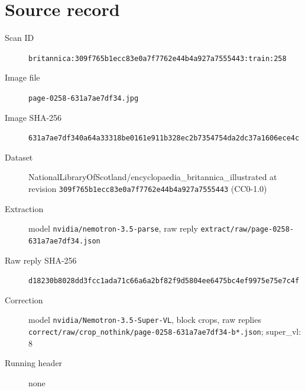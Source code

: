\documentclass{article}
\begin{document}
\section*{Source record}
\begin{description}
\item[Scan ID] \texttt{britannica:309f765b1ecc83e0a7f7762e44b4a927a7555443:train:258}
\item[Image file] \texttt{page-0258-631a7ae7df34.jpg}
\item[Image SHA-256] \texttt{631a7ae7df340a64a33318be0161e911b328ec2b7354754da2dc37a1606ece4c}
\item[Dataset] NationalLibraryOfScotland/encyclopaedia\_britannica\_illustrated at revision \texttt{309f765b1ecc83e0a7f7762e44b4a927a7555443} (CC0-1.0)
\item[Extraction] model \texttt{nvidia/nemotron-3.5-parse}, raw reply \texttt{extract/raw/page-0258-631a7ae7df34.json}
\item[Raw reply SHA-256] \texttt{d18230b8028dd3fcc1ada71c66a6a2bf82f9d5804ee6475bc4ef9975e75e7c4f}
\item[Correction] model \texttt{nvidia/Nemotron-3.5-Super-VL}, block crops, raw replies \texttt{correct/raw/crop\_nothink/page-0258-631a7ae7df34-b*.json}; super\_vl: 8
\item[Running header] none
\end{description}
\end{document}
